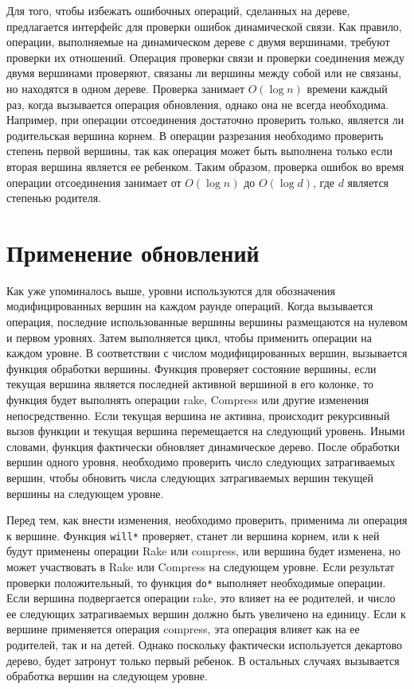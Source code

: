 \documentclass[specification,annotation]{itmo-student-thesis}
\begin{document}
Для того, чтобы избежать ошибочных операций, сделанных на дереве, предлагается интерфейс для проверки ошибок динамической связи. Как правило, операции, 
выполняемые на динамическом дереве с двумя вершинами, требуют проверки их отношений. Операция проверки связи и проверки соединения между двумя вершинами проверяют, связаны ли вершины между собой или не связаны, 
но находятся в одном дереве. Проверка занимает $O (\log n)$ времени каждый раз, когда вызывается операция обновления, однако она не всегда необходима. 
Например, при операции отсоединения достаточно проверить только, является ли родительская вершина корнем. В операции разрезания необходимо проверить степень первой вершины, так как операция может быть выполнена только если вторая вершина является ее ребенком. Таким образом, проверка ошибок во время операции отсоединения занимает от $O (\log n)$ до $O (\log d)$, где $d$ является степенью родителя.

\section{Применение обновлений}

Как уже упоминалось выше, уровни используются для обозначения модифицированных вершин на каждом раунде операций. Когда вызывается операция, последние использованные вершины вершины размещаются на
нулевом и первом уровнях. Затем выполняется цикл, чтобы применить операции на каждом уровне. В соответствии с числом модифицированных вершин, вызывается функция обработки вершины. Функция проверяет 
состояние вершины, если текущая вершина является последней активной вершиной в его колонке, то функция будет выполнять операции rake, Compress или другие изменения непосредственно. Eсли текущая вершина не 
активна, происходит рекурсивный вызов функции и текущая вершина перемещается на следующий уровень. Иными словами, функция фактически обновляет динамическое дерево. После обработки вершин одного уровня, необходимо проверить число следующих затрагиваемых вершин, чтобы обновить числа следующих затрагиваемых вершин текущей вершины на следующем уровне.

Перед тем, как внести изменения, необходимо проверить, применима ли операция к вершине. Функция \texttt{will{\textunderscore}*} проверяет, станет ли вершина корнем, или к ней будут применены операции Rake или compress, или вершина будет изменена, но может участвовать в Rake или Compress на следующем уровне. Если результат проверки положительный, то функция \texttt{do{\textunderscore}*} выполняет необходимые операции. Если 
вершина подвергается операции rake, 
это влияет на ее родителей, и число ее следующих затрагиваемых вершин должно быть увеличено на единицу. Если к вершине применяется операция compress, эта операция влияет как на ее родителей, так и на детей. Однако поскольку фактически используется декартово дерево, будет затронут только первый ребенок. В остальных случаях вызывается обработка вершин на следующем уровне.
\end{document}

